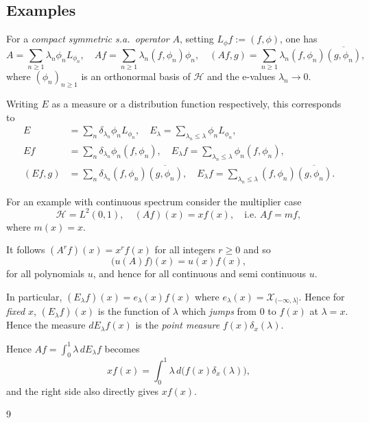 \documentclass[a4paper]{amsart}
\theoremstyle{plain}
\theoremstyle{definition}
\theoremstyle{remark}
\begin{document}
\subsection{Examples}
For a \emph{compact symmetric s.a.\ operator} $ A $,  setting $ L_\phi f := (f,\phi) $,  one  has
\[
A = \sum_{n\geq 1} \lambda_n \phi_n L_{\phi_n}, \quad Af = \sum_{n \geq 1} \lambda_n(f,\phi_n) \phi_n,
\quad (Af,g) = \sum_{n \geq 1} \lambda_n(f,\phi_n) \overline{(g,\phi_n)},
\] 
where $ (\phi_n)_{n\geq 1} $ is an orthonormal basis of $ \mathcal{H}  $ and the e-values $\lambda_n \to 0 $.

 Writing $ E $ as a measure or a distribution function respectively, this corresponds to
 \begin{align*}
E &= \sum_n \delta_{\lambda_n} \phi_n L_{\phi_n}, 
      \quad E_\lambda = \sum_{\lambda_n \leq \lambda} \phi_n L_{\phi_n}, \\
Ef &= \sum_n \delta_{\lambda_n} \phi_n (f,\phi_n), 
      \quad E_\lambda f = \sum_{\lambda_n \leq \lambda} \phi_n (f,\phi_n), \\
(Ef,g) &= \sum_n \delta_{\lambda_n} (f,\phi_n) \overline{(g,\phi_n)}, 
      \quad E_\lambda f = \sum_{\lambda_n \leq \lambda}  (f,\phi_n)   \overline{(g,\phi_n)}.
\end{align*}




\medskip For an example with continuous spectrum consider the multiplier case 
\[
\mathcal{H} = L^2(0,1), \quad (Af)(x) = x f(x),\quad \text{i.e. }  Af = mf,
\]
where $ m(x) =x $.

It follows $ (A^r f)(x) = x^r f(x) $ for all integers $ r\geq 0 $ and so
\[
\big(u(A)f\big)(x) = u(x) f(x),
\]
for all polynomials $ u $, and hence for all continuous and semi continuous $ u $.

In particular, $ (E_\lambda f)(x) = e_\lambda(x) f(x) $ where $ e_\lambda(x) = \mathcal{X}_{(-\infty, \lambda ]}$.
Hence for \emph{fixed} $ x $, $  (E_\lambda f)(x) $ is the function of $ \lambda  $ which \emph{jumps} from $ 0 $ to $ f(x) $ at $ \lambda = x $.   Hence the measure $  dE_\lambda f(x) $ is the \emph{point measure} $ f(x) \delta _x (\lambda )$.

Hence $ Af = \int_0^1 \lambda \, dE_\lambda f $ becomes
\[  x f(x) = \int_0^1 \lambda \, d\big( f(x) \delta _x( \lambda )  \big), \]
and the right side also directly gives $ x f(x) $.




\begin{thebibliography}{9} 



		



\end{thebibliography}
\end{document}
